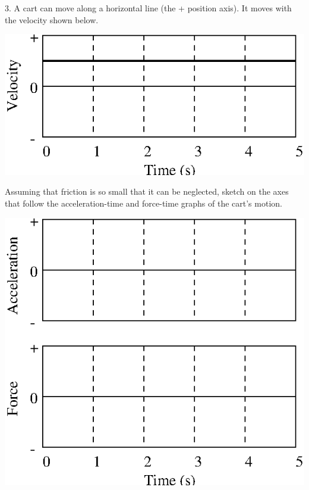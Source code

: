 3. A cart can move along a horizontal line (the + position axis). It moves with
the velocity shown below.

\vspace{0.3cm}
{\par\centering \includegraphics{force1_fig8.eps} \par}
\vspace{0.3cm}

Assuming that friction is so small that it can be neglected, sketch on the axes
that follow the acceleration-time and force-time graphs of the cart's motion.

\vspace{0.3cm}
{\par\centering \includegraphics{force1_fig9.eps} \par}
\vspace{0.3cm}

